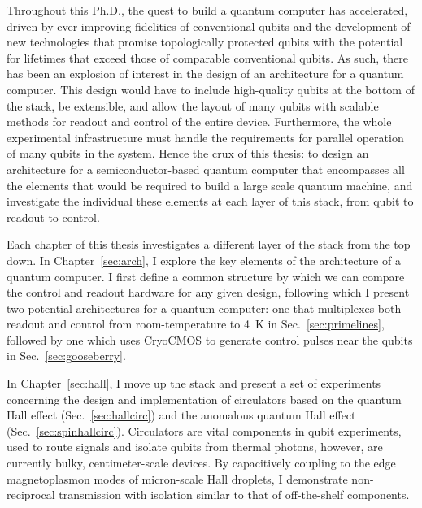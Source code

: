 
Throughout this Ph.D., the quest to build a quantum computer has accelerated, driven by ever-improving fidelities
of conventional qubits and the development of new technologies that promise topologically protected qubits with
the potential for lifetimes that exceed those of comparable conventional qubits. As such, there has been an
explosion of interest in the design of an architecture for a quantum computer. This design would have to include
high-quality qubits at the bottom of the stack, be extensible, and allow the layout of many qubits with scalable
methods for readout and control of the entire device. Furthermore, the whole experimental infrastructure must
handle the requirements for parallel operation of many qubits in the system. Hence the crux of this thesis: to
design an architecture for a semiconductor-based quantum computer that encompasses all the elements that would
be required to build a large scale quantum machine, and investigate the individual these elements at each layer
of this stack, from qubit to readout to control.

Each chapter of this thesis investigates a different layer of the stack from the top down.
In Chapter~\ref{sec:arch}, I explore the key elements of the architecture of a quantum computer.
I first define a common structure by which we can compare the control and readout hardware for
any given design, following which I present two potential architectures for a quantum computer:
one that multiplexes both readout and control from room-temperature to \SI{4}{\kelvin} in
Sec.~\ref{sec:primelines}, followed by one which uses {CryoCMOS} to generate control pulses near the qubits
in Sec.~\ref{sec:gooseberry}.

In Chapter~\ref{sec:hall}, I move up the stack and present a set of experiments concerning the design and
implementation of circulators based on the quantum Hall effect (Sec.~\ref{sec:hallcirc}) and the
anomalous quantum Hall effect (Sec.~\ref{sec:spinhallcirc}). Circulators are vital components in qubit
experiments, used to route signals and isolate qubits from thermal photons, however, are currently bulky,
centimeter-scale devices. By capacitively coupling to the edge magnetoplasmon modes of micron-scale Hall droplets,
I demonstrate non-reciprocal transmission with isolation similar to that of off-the-shelf components.

